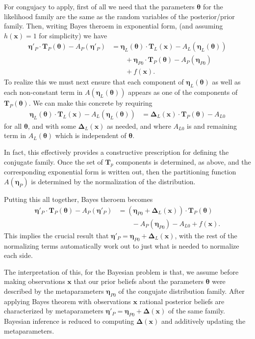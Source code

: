\documentclass[aps,showpacs,twocolumn,prd,superscriptaddress,nofootinbib]{revtex4}
\newcommand{\nn}{\nonumber}
\begin{document}
For congujacy to apply, first of all we need that the parameters $\bm\theta$ for the likelihood family are the same as the random variables of the posterior/prior family. Then, writing Bayes theroem in exponential form, (and assuming $h(\bm x)=1$ for simplicity) we have
\begin{align}
  \bm\eta'_P\cdot\bm T_P(\bm\theta) - A_P(\bm\eta'_P)
  &= \bm\eta_L(\bm\theta)\cdot\bm T_L(\bm x) - A_L(\bm\eta_L(\bm\theta))\nn\\
  &\qquad+\bm\eta_{P0}\cdot\bm T_P(\bm\theta) - A_P(\bm\eta_{P0})\nn\\
  &\qquad+ f(\bm x).
\end{align}
To realize this we must next ensure that each component of $\bm\eta_L(\bm\theta)$ as well as each non-constant term in $A(\bm\eta_L(\bm\theta))$ appears as one of the components of $\bm T_P(\bm\theta)$.  We can make this concrete by requiring
\begin{align}
  \bm\eta_L(\bm\theta)\cdot\bm T_L(\bm x) - A_L(\bm\eta_L(\bm\theta))
  &=\bm\Delta_L(\bm x)\cdot\bm T_P(\bm\theta) - A_{L0}
\end{align}
for all $\bm\theta$, and with some $\bm\Delta_L(\bm x)$ as needed, and where $A_{L0}$ is and remaining term in $A_L(\bm\theta)$ which is independent of $\bm\theta$. 

In fact, this effectively provides a constructive prescription for defining the conjugate family.  Once the set of $\bm T_p$ components is determined, as above, and the corresponding exponential form is written out, then the partitioning function $A(\bm\eta_P)$ is determined by the normalization of the distribution. 

Putting this all together, Bayes theroem becomes
\begin{align}
  \bm\eta'_P\cdot\bm T_P(\bm\theta) - A_P(\bm\eta'_P)
  &=\left(\bm\eta_{P0}+\bm\Delta_L(\bm x)\right)\cdot\bm T_P(\bm\theta)\nn\\
    &\qquad - A_P(\bm\eta_{P0})- A_{L0} + f(\bm x).
\end{align}
This implies the crucial result that $\bm\eta'_P=\bm\eta_{P0}+\bm\Delta_L(\bm x)$, with the rest of the normalizing terms automatically work out to just what is needed to normalize each side.

The interpretation of this, for the Bayesian problem is that, we assume before making observations $\bm x$ that our prior beliefs about the parameters $\bm\theta$ were described by the metaparameters $\bm\eta_{P0}$ of the congujate distribution family.  After applying Bayes theorem with observations $\bm x$ rational posterior beliefs are characterized by metaparameters $\bm\eta'_{P}=\bm\eta_{P0}+\bm\Delta(\bm x)$ of the same family.  Bayesian inference is reduced to computing $\bm\Delta(\bm x)$ and additively updating the metaparameters.
\end{document}
